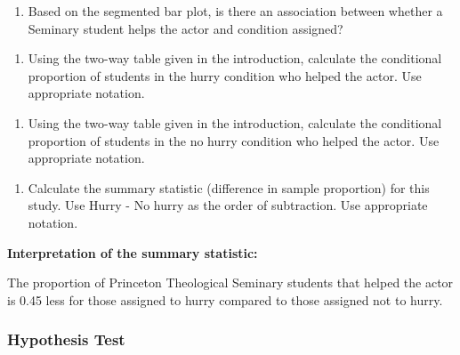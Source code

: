\documentclass[
]{report}
\providecommand{\tightlist}{%
  \setlength{\itemsep}{0pt}\setlength{\parskip}{0pt}}
\begin{document}
\begin{enumerate}
\def\labelenumi{\arabic{enumi}.}
\setcounter{enumi}{2}
\tightlist
\item
  Based on the segmented bar plot, is there an association between whether a Seminary student helps the actor and condition assigned?
\end{enumerate}

\vspace{0.4in}

\begin{enumerate}
\def\labelenumi{\arabic{enumi}.}
\setcounter{enumi}{3}
\tightlist
\item
  Using the two-way table given in the introduction, calculate the conditional proportion of students in the hurry condition who helped the actor. Use appropriate notation.
\end{enumerate}

\vspace{.3in}

\begin{enumerate}
\def\labelenumi{\arabic{enumi}.}
\setcounter{enumi}{4}
\tightlist
\item
  Using the two-way table given in the introduction, calculate the conditional proportion of students in the no hurry condition who helped the actor. Use appropriate notation.
\end{enumerate}

\vspace{.3in}

\begin{enumerate}
\def\labelenumi{\arabic{enumi}.}
\setcounter{enumi}{5}
\tightlist
\item
  Calculate the summary statistic (difference in sample proportion) for this study. Use Hurry - No hurry as the order of subtraction. Use appropriate notation.
\end{enumerate}

\vspace{0.5in}

\textbf{Interpretation of the summary statistic:}

The proportion of Princeton Theological Seminary students that helped the actor is 0.45 less for those assigned to hurry compared to those assigned not to hurry.

\subsubsection*{Hypothesis Test}\label{hypothesis-test}
\end{document}
